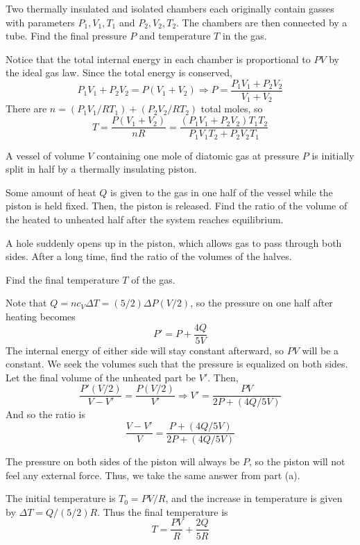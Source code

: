 \documentclass[11pt]{scrartcl}
\begin{document}
\begin{prob}
    Two thermally insulated and isolated chambers each originally contain gasses with parameters $P_1,V_1,T_1$ and $P_2,V_2,T_2$. The chambers are then connected by a tube. Find the final pressure $P$ and temperature $T$ in the gas. 
\end{prob}

\begin{sol}
    Notice that the total internal energy in each chamber is proportional to $PV$ by the ideal gas law. Since the total energy is conserved, $$P_1V_1+P_2V_2=P(V_1+V_2)\Rightarrow P=\boxed{\frac{P_1V_1+P_2V_2}{V_1+V_2}}$$ There are $n=(P_1V_1/RT_1)+(P_2V_2/RT_2)$ total moles, so $$T=\frac{P(V_1+V_2)}{nR}=\boxed{\frac{(P_1V_1+P_2V_2)T_1T_2}{P_1V_1T_2+P_2V_2T_1}}$$
\end{sol}

\begin{prob}
    A vessel of volume $V$ containing one mole of diatomic gas at pressure $P$ is initially split in half by a thermally insulating piston. 
    \begin{anum}
        \item Some amount of heat $Q$ is given to the gas in one half of the vessel while the piston is held fixed. Then, the piston is released. Find the ratio of the volume of the heated to unheated half after the system reaches equilibrium. 
        \item A hole suddenly opens up in the piston, which allows gas to pass through both sides. After a long time, find the ratio of the volumes of the halves. 
        \item Find the final temperature $T$ of the gas. 
    \end{anum}
\end{prob}

\begin{sol}
    \begin{anum}
        \item Note that $Q=nc_V\Delta T=(5/2)\Delta P(V/2)$, so the pressure on one half after heating becomes $$P'=P+\frac{4Q}{5V}$$ The internal energy of either side will stay constant afterward, so $PV$ will be a constant. We seek the volumes such that the pressure is equalized on both sides. Let the final volume of the unheated part be $V'$. Then, $$\frac{P'(V/2)}{V-V'}=\frac{P(V/2)}{V'}\Rightarrow V'=\frac{PV}{2P+(4Q/5V)}$$And so the ratio is $$\frac{V-V'}{V}=\boxed{\frac{P+(4Q/5V)}{2P+(4Q/5V)}}$$
        \item The pressure on both sides of the piston will always be $P$, so the piston will not feel any external force. Thus, we take the same answer from part (a).
        \item The initial temperature is $T_0=PV/R$, and the increase in temperature is given by $\Delta T=Q/(5/2)R$. Thus the final temperature is $$T=\boxed{\frac{PV}{R}+\frac{2Q}{5R}}$$
    \end{anum}
\end{sol}
\end{document}
